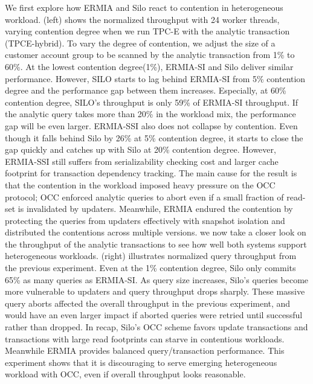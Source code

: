 
We first explore how ERMIA and Silo react to contention in heterogeneous workload.  (left) shows the normalized throughput with 24 worker threads, varying contention degree when we run TPC-E with the analytic transaction (TPCE-hybrid). To vary the degree of contention, we adjust the size of a customer account group to be scanned by the analytic transaction from 1\% to 60\%. At the lowest contention degree(1\%), ERMIA-SI and Silo deliver similar performance. However, SILO starts to lag behind ERMIA-SI from 5\% contention degree and the performance gap between them increases. Especially, at 60\% contention degree, SILO's throughput is only 59\% of ERMIA-SI throughput. If the analytic query takes more than 20\% in the workload mix, the performance gap will be even larger. ERMIA-SSI also does not collapse by contention. Even though it falls behind Silo by 26\% at 5\% contention degree, it starts to close the gap quickly and catches up with Silo at 20\% contention degree. However, ERMIA-SSI still suffers from serializability checking cost and larger cache footprint for transaction dependency tracking.
The main cause for the result is that the contention in the workload imposed heavy pressure on the OCC protocol; OCC enforced analytic queries to abort even if a small fraction of read-set is invalidated by updaters. Meanwhile, ERMIA endured the contention by protecting the queries from updaters effectively with snapshot isolation and distributed the contentions across multiple versions. 
we now take a closer look on the throughput of the analytic transactions to see how well both systems support heterogeneous workloads.  (right) illustrates normalized query throughput from the previous experiment. Even at the 1\% contention degree, Silo only commits 65\% as many queries as ERMIA-SI. As query size increases, Silo's queries become more vulnerable to updaters and query throughput drops sharply. These massive query aborts affected the overall throughput in the previous experiment, and would have an even larger impact if aborted queries were retried until successful rather than dropped. In recap, Silo's OCC scheme favors update transactions and transactions with large read footprints can starve in contentious workloads. Meanwhile ERMIA provides balanced query/transaction performance. This experiment shows that it is discouraging to serve emerging heterogeneous workload with OCC, even if overall throughput looks reasonable. 
   
